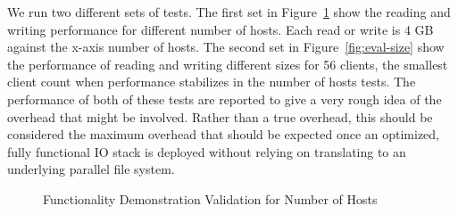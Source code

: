 \documentclass[conference]{IEEEtran}
\begin{document}
We run two different sets of tests. The first set in
Figure~\ref{fig:eval-hosts} show the reading and writing performance for
different number of hosts. Each read or write is 4 GB against the x-axis number
of hosts. The second set in Figure~\ref{fig:eval-size} show the performance of
reading and writing different sizes for 56 clients, the smallest client count
when performance stabilizes in the number of hosts tests.  The performance of
both of these tests are reported to give a very rough idea of the overhead that
might be involved. Rather than a true overhead, this should be considered the
maximum overhead that should be expected once an optimized, fully functional IO
stack is deployed without relying on translating to an underlying parallel file
system. 

\begin{figure}[htbp!]
\centering
\vspace{-0.10in}
\vspace{-0.10in}
\caption{Functionality Demonstration Validation for Number of Hosts}
\label{fig:eval-hosts}
\vspace{-0.05in}
\end{figure}
\end{document}

